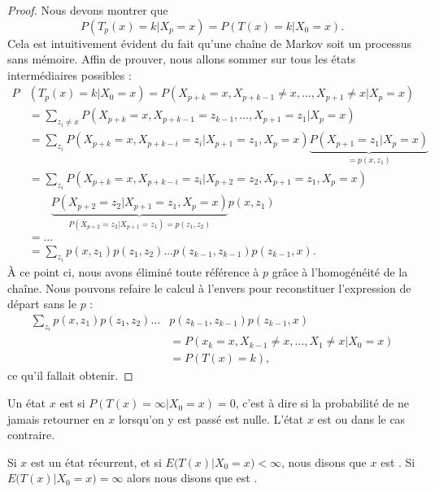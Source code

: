 \begin{proof}
    Nous devons montrer que 
    \begin{equation}
        P(T_p(x)=k|X_p=x)=P(T(x)=k|X_0=x).
    \end{equation}
    Cela est intuitivement évident du fait qu'une chaîne de Markov soit un processus sans mémoire. Affin de prouver, nous allons sommer sur tous les états intermédiaires possibles :
    \begin{subequations}
        \begin{align}
            P&(T_p(x)=k|X_0=x)=P(X_{p+k}=x,X_{p+k-1}\neq x,\ldots,X_{p+1}\neq x|X_p=x)\\
            &=\sum_{z_i\neq x}P(X_{p+k}=x,X_{p+k-1}=z_{k-1},\ldots,X_{p+1}=z_1|X_p=x)\\
            &=\sum_{z_i}P(X_{p+k}=x,X_{p+k-i}=z_i|X_{p+1}=z_1,X_p=x)\underbrace{P(X_{p+1}=z_1|X_p=x)}_{=p(x,z_1)}\\
            &=\sum_{z_i}P(X_{p+k}=x,X_{p+k-i}=z_i|X_{p+2}=z_2,X_{p+1}=z_1,X_p=x)\\
            &\qquad\underbrace{P(X_{p+2}=z_2|X_{p+1}=z_1,X_p=x)}_{P(X_{p+2}=z_2|X_{p+1}=z_1)=p(z_1,z_2)}p(x,z_1)\\
            &=\ldots\\
            &=\sum_{z_i}p(x,z_1)p(z_1,z_2)\ldots p(z_{k-1},z_{k-1})p(z_{k-1},x).
        \end{align}
    \end{subequations}
    À ce point ci, nous avons éliminé toute référence à \( p\) grâce à l'homogénéité de la chaîne. Nous pouvons refaire le calcul à l'envers pour reconstituer l'expression de départ sans le \( p\) :
    \begin{subequations}
        \begin{align}
         \sum_{z_i}p(x,z_1)p(z_1,z_2)\ldots &p(z_{k-1},z_{k-1})p(z_{k-1},x)\\
         &=P(x_k=x,X_{k-1}\neq x,\ldots,X_1\neq x|X_0=x)\\
         &=P(T(x)=k),
        \end{align}
    \end{subequations}
    ce qu'il fallait obtenir.
\end{proof}

\begin{definition}\label{DefWknULk}
    Un état \( x\) est  si \( P(T(x)=\infty|X_0=x)=0\), c'est à dire si la probabilité de ne jamais retourner en $x$ lorsqu'on y est passé est nulle. L'état \( x\) est  ou  dans le cas contraire.

    Si \( x\) est un état récurrent, et si \( E\big( T(x)|X_0=x \big)<\infty\), nous disons que \( x\) est . Si \( E\big( T(x)|X_0=x \big)=\infty\) alors nous disons que est .
\end{definition}

